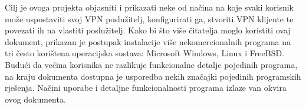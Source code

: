 \hfill \smallbreak
Cilj je ovoga projekta objasniti i prikazati neke od načina na koje svaki korisnik može uspostaviti svoj VPN poslužitelj, konfigurirati ga, stvoriti VPN klijente te povezati ih na vlastiti poslužitelj. Kako bi što više čitatelja moglo koristiti ovaj dokument, prikazan je postupak instalacije više nekomercionalnih programa na tri često korištena operacijska sustava: Microsoft Windows, Linux i FreeBSD. Budući da većina korisnika ne razlikuje funkcionalne detalje pojedinih programa, na kraju dokumenta dostupna je usporedba nekih značajki pojedinih programskih rješenja.\smallbreak
Načini uporabe i detaljne funkcionalnosti programa izlaze van okvira ovog dokumenta.
\bigbreak
